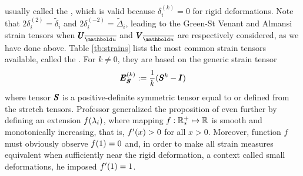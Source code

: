 usually called the , which is valid because $\delta_i^{(k)}=0$ for rigid deformations. Note that $2\delta_i^{(2)}=\tilde{\delta}_i$ and $2\delta_i^{(-2)}=\tilde{\Delta}_i$, leading to the Green-St Venant and Almansi strain tensors when $\tnr{U}_{\overline{\vto{u}}}$ and $\tnr{V}_{\overline{\vto{u}}}$ are respectively considered, as we have done above. Table \ref{tb:strains} lists the most common strain tensors available, called the . For $k\neq 0$, they are based on the generic strain tensor 
\begin{equation}
\pmb{E}_{\pmb{S}}^{(k)}:=\dfrac{1}{k}(\pmb{S}^k-\pmb{I})
\end{equation}
where tensor $\pmb{S}$ is a positive-definite symmetric tensor equal to or defined from the stretch tensors. Professor \cite{hill_1968_1} generalized the proposition of \cite{seth_1961} even further by defining an extension $f(\lambda_i)$, where mapping $f : \mathbb{R}^+_* \mapsto \mathbb{R}$ is smooth and monotonically increasing, that is, $f'(x)>0$ for all $x>0$. Moreover, function $f$ must obviously observe $f(1)=0$ and, in order to make all strain measures equivalent when sufficiently near the rigid deformation, a context called small deformations, he imposed $f'(1)=1$.

